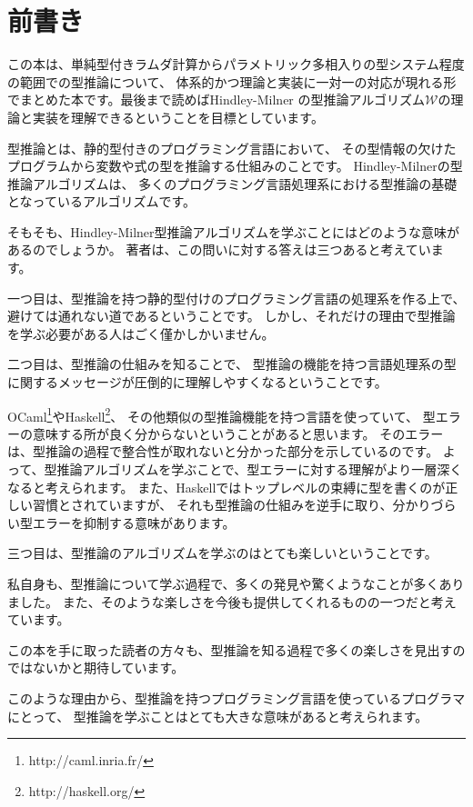 
\chapter{前書き}

この本は、単純型付きラムダ計算からパラメトリック多相入りの型システム程度の範囲での型推論について、
体系的かつ理論と実装に一対一の対応が現れる形でまとめた本です。最後まで読めばHindley-Milner
の型推論アルゴリズム$\mathcal W$の理論と実装を理解できるということを目標としています。

型推論とは、静的型付きのプログラミング言語において、
その型情報の欠けたプログラムから変数や式の型を推論する仕組みのことです。
Hindley-Milnerの型推論アルゴリズムは、
多くのプログラミング言語処理系における型推論の基礎となっているアルゴリズムです。

そもそも、Hindley-Milner型推論アルゴリズムを学ぶことにはどのような意味があるのでしょうか。
著者は、この問いに対する答えは三つあると考えています。

一つ目は、型推論を持つ静的型付けのプログラミング言語の処理系を作る上で、
避けては通れない道であるということです。
しかし、それだけの理由で型推論を学ぶ必要がある人はごく僅かしかいません。

二つ目は、型推論の仕組みを知ることで、
型推論の機能を持つ言語処理系の型に関するメッセージが圧倒的に理解しやすくなるということです。

OCaml\footnote{http://caml.inria.fr/}やHaskell\footnote{http://haskell.org/}、
その他類似の型推論機能を持つ言語を使っていて、
型エラーの意味する所が良く分からないということがあると思います。
そのエラーは、型推論の過程で整合性が取れないと分かった部分を示しているのです。
よって、型推論アルゴリズムを学ぶことで、型エラーに対する理解がより一層深くなると考えられます。
また、Haskellではトップレベルの束縛に型を書くのが正しい習慣とされていますが、
それも型推論の仕組みを逆手に取り、分かりづらい型エラーを抑制する意味があります。

三つ目は、型推論のアルゴリズムを学ぶのはとても楽しいということです。

私自身も、型推論について学ぶ過程で、多くの発見や驚くようなことが多くありました。
また、そのような楽しさを今後も提供してくれるものの一つだと考えています。

この本を手に取った読者の方々も、型推論を知る過程で多くの楽しさを見出すのではないかと期待しています。

このような理由から、型推論を持つプログラミング言語を使っているプログラマにとって、
型推論を学ぶことはとても大きな意味があると考えられます。

